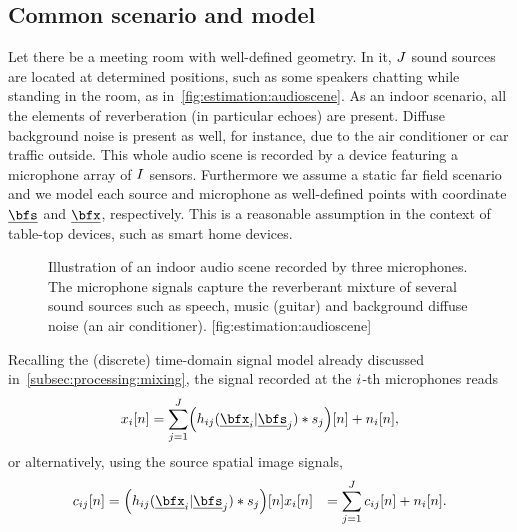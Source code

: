 \subsection{Common scenario and model}
Let there be a meeting room with well-defined geometry.
In it, $J$ sound sources are located at determined positions, such as some speakers chatting while standing in the room, as in~\cref{fig:estimation:audioscene}.
As an indoor scenario, all the elements of reverberation (in particular echoes) are present.
Diffuse background noise is present as well, for instance, due to the air conditioner or car traffic outside.
This whole audio scene is recorded by a device featuring a microphone array of $I$ sensors.
Furthermore we assume a static far field scenario and we model each source and microphone as well-defined points with coordinate $\positionSource$ and $\positionMicrophone$, respectively.
This is a reasonable assumption in the context of table-top devices, such as smart home devices.
\begin{figure}[]
    \begin{sidecaption}{%
        Illustration of an indoor audio scene recorded by three microphones.
        The microphone signals capture the reverberant mixture of several sound sources such as speech, music (guitar) and background diffuse noise (an air conditioner).
    }[fig:estimation:audioscene]
    \centering
    \resizebox{\linewidth}{!}{}
    \end{sidecaption}
\end{figure}
Recalling the (discrete) time-domain signal model already discussed in~\cref{subsec:processing:mixing}, the signal recorded at the $i$-th microphones reads
\begin{equation}
    \label{eq:application:mix}
    \mic_\idxMic[n] = \sum_{\idxSrc = 1}^{\numSrcs}
        \kparen{\flt_{\idxMicSrc}( \positionMicrophone_{\idxMic}  | \positionSource_{\idxSrc}) \convDis \src_{\idxSrc}} [n] + \nse_\idxMic[n]
    ,
\end{equation}
or alternatively, using the source spatial image signals,
\begin{equation}
    \label{eq:application:mix_img}
    \begin{aligned}
        \img_{\idxMicSrc}[n]  &= \kparen{\flt_{\idxMicSrc}( \positionMicrophone_{\idxMic}  | \positionSource_{\idxSrc}) \convDis \src_{\idxSrc}}[n]
        \mic_\idxMic[n]     &= \sum_{\idxSrc = 1}^{\numSrcs} \img_{\idxMicSrc}[n] + \nse_\idxMic[n].
    \end{aligned}
\end{equation}
